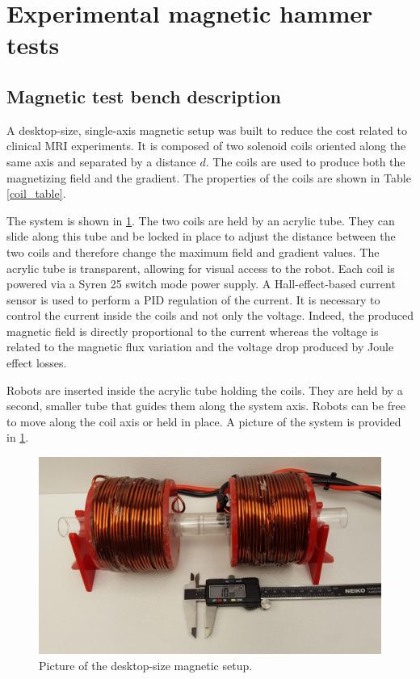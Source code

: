 \documentclass[letterpaper, 10 pt, conference]{ieeeconf}  %
\begin{document}
\section{Experimental magnetic hammer tests}
\label{experiment}
\subsection{Magnetic test bench description}

A desktop-size, single-axis magnetic setup was built to reduce the cost related to clinical MRI experiments.
 It is composed of two solenoid coils oriented along the same axis and separated by a distance $d$. 
 The coils are used to produce both the magnetizing field and the gradient. 
 The properties of the coils are shown in Table \ref{coil_table}.\par
The system is shown in \cref{magnetic_setup}.
 The two coils are held by an acrylic tube. 
 They can slide along this tube and be locked in place to adjust the distance between the two coils and therefore change the maximum field and gradient values. 
 The acrylic tube is transparent, allowing for visual access to the robot.
Each coil is powered via a Syren 25 switch mode power supply. 
A Hall-effect-based current sensor is used to perform a PID regulation of the current. 
It is necessary to control the current inside the coils and not only the voltage. 
Indeed, the produced magnetic field is directly proportional to the current whereas the voltage is related to the magnetic flux variation and the voltage drop produced by Joule effect losses.\par
Robots are inserted inside the acrylic tube holding the coils. 
They are held by a second, smaller tube that guides them along the system axis. 
Robots can be free to move along the coil axis or held in place. 
A picture of the system is provided in \cref{magnetic_setup}.

\begin{figure}
  \includegraphics[width=\linewidth]{Magnetic_setup.jpg}
  \caption{Picture of the desktop-size magnetic setup.}
  \label{magnetic_setup}
\end{figure}
\end{document}
